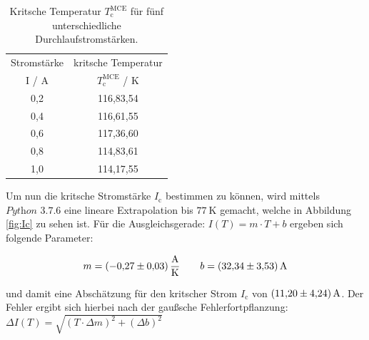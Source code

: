 \begin{table}
  \centering
  \caption{Kritsche Temperatur $T^{\text{MCE}}_{\text{c}}$ für fünf unterschiedliche
	Durchlaufstromstärken.}
  \label{tab:Ic}
  \begin{tabular}{S | S}
    \toprule
    {Stromstärke} & {kritsche Temperatur} \\
    {I / A} & {$T^{\text{MCE}}_{\text{c}}$ / K }  \\
    \midrule
    {0,2} & {116,83,54}	\\
		{0,4} & {116,61,55}	\\
		{0,6} & {117,36,60}	\\[-1.5ex]
		\hline\noalign{\vspace{\dimexpr 1.5ex-\doublerulesep}}
		{0,8} & {114,83,61}	\\
		{1,0} & {114,17,55}	\\
    \bottomrule
  \end{tabular}
\end{table}

\noindent
Um nun die kritsche Stromstärke $I_{\text{c}}$ bestimmen zu können, wird mittels
$\textit{Python 3.7.6}$ eine lineare Extrapolation bis $\SI{77}{\kelvin}$ gemacht,
welche in Abbildung \ref{fig:Ic} zu sehen ist. Für die Ausgleichsgerade:
$I(T)=m\cdot T + b$
ergeben sich folgende Parameter:

\begin{equation*}
	m = \SI{-0,27\pm0,03}{\ampere\per\kelvin}
	\qquad
	b = \SI{32,34\pm3,53}{\ampere}
	\label{AF4}
\end{equation*}

\noindent
und damit eine Abschätzung für den kritscher Strom $I_{\text{c}}$ von
$\SI{11,2\pm4,24}{\ampere}$. Der Fehler ergibt sich hierbei nach der gaußsche
Fehlerfortpflanzung: $\Delta I(T) = \sqrt{(T\cdot \Delta m)^2+(\Delta b)^2}$

